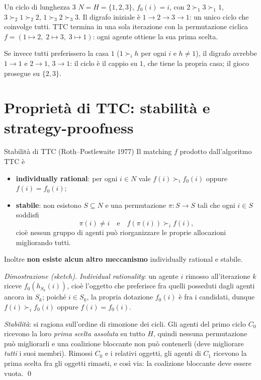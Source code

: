 \documentclass[12pt,a4paper,twoside]{book}
\theoremstyle{plain}
\theoremstyle{definition}
\begin{document}
\begin{exbox}{Un ciclo di lunghezza $3$}
$N=H=\{1,2,3\}$, $f_0(i)=i$, con $2\succ_1 3\succ_1 1$, $3\succ_2 1\succ_2 2$, $1\succ_3 2\succ_3 3$. Il digrafo iniziale è $1\to 2\to 3\to 1$: un unico ciclo che coinvolge tutti. TTC termina in una sola iterazione con la permutazione ciclica $f=(1\mapsto 2,\;2\mapsto 3,\;3\mapsto 1)$: ogni agente ottiene la sua prima scelta.

Se invece tutti preferissero la casa $1$ ($1\succ_i h$ per ogni $i$ e $h\neq 1$), il digrafo avrebbe $1\to 1$ e $2\to 1$, $3\to 1$: il ciclo è il cappio su $1$, che tiene la propria casa; il gioco prosegue su $\{2,3\}$.
\end{exbox}

\section{Proprietà di TTC: stabilità e strategy-proofness}

\begin{thmbox}{Stabilità di TTC (Roth--Postlewaite 1977)}
Il matching $f$ prodotto dall'algoritmo TTC è
\begin{itemize}
  \item \textbf{individually rational}: per ogni $i\in N$ vale $f(i)\succ_i f_0(i)$ oppure $f(i)=f_0(i)$;
  \item \textbf{stabile}: non esistono $S\subseteq N$ e una permutazione $\pi:S\to S$ tali che ogni $i\in S$ soddisfi
  \[ \pi(i)\ne i\quad\text{e}\quad f(\pi(i))\succ_i f(i), \]
  cioè nessun gruppo di agenti può riorganizzare le proprie allocazioni migliorando tutti.
\end{itemize}
Inoltre \textbf{non esiste alcun altro meccanismo} individually rational e stabile.
\end{thmbox}

\textit{Dimostrazione (sketch).} \emph{Individual rationality}: un agente $i$ rimosso all'iterazione $k$ riceve $f_0(h_{S_k}(i))$, cioè l'oggetto che preferisce fra quelli posseduti dagli agenti ancora in $S_k$; poiché $i\in S_k$, la propria dotazione $f_0(i)$ è fra i candidati, dunque $f(i)\succ_i f_0(i)$ oppure $f(i)=f_0(i)$.

\emph{Stabilità}: si ragiona sull'ordine di rimozione dei cicli. Gli agenti del primo ciclo $C_0$ ricevono la loro \emph{prima scelta assoluta} su tutto $H$, quindi nessuna permutazione può migliorarli e una coalizione bloccante non può contenerli (deve migliorare \emph{tutti} i suoi membri). Rimossi $C_0$ e i relativi oggetti, gli agenti di $C_1$ ricevono la prima scelta fra gli oggetti rimasti, e così via: la coalizione bloccante deve essere vuota. \qed
\end{document}
